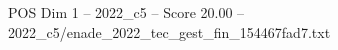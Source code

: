 \begin{textsample}{POS Dim 1 – 2022\_c5 – Score 20.00 – 2022\_c5/enade\_2022\_tec\_gest\_fin\_154467fad7.txt}
\end{textsample}
